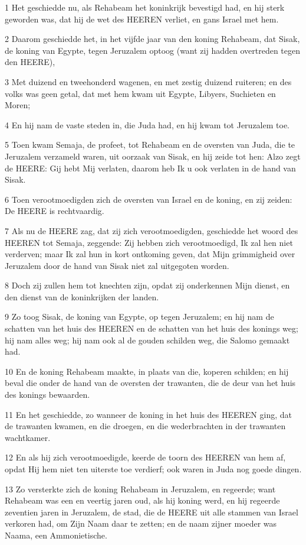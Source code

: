 \par 1 Het geschiedde nu, als Rehabeam het koninkrijk bevestigd had, en hij sterk geworden was, dat hij de wet des HEEREN verliet, en gans Israel met hem.
\par 2 Daarom geschiedde het, in het vijfde jaar van den koning Rehabeam, dat Sisak, de koning van Egypte, tegen Jeruzalem optoog (want zij hadden overtreden tegen den HEERE),
\par 3 Met duizend en tweehonderd wagenen, en met zestig duizend ruiteren; en des volks was geen getal, dat met hem kwam uit Egypte, Libyers, Suchieten en Moren;
\par 4 En hij nam de vaste steden in, die Juda had, en hij kwam tot Jeruzalem toe.
\par 5 Toen kwam Semaja, de profeet, tot Rehabeam en de oversten van Juda, die te Jeruzalem verzameld waren, uit oorzaak van Sisak, en hij zeide tot hen: Alzo zegt de HEERE: Gij hebt Mij verlaten, daarom heb Ik u ook verlaten in de hand van Sisak.
\par 6 Toen verootmoedigden zich de oversten van Israel en de koning, en zij zeiden: De HEERE is rechtvaardig.
\par 7 Als nu de HEERE zag, dat zij zich verootmoedigden, geschiedde het woord des HEEREN tot Semaja, zeggende: Zij hebben zich verootmoedigd, Ik zal hen niet verderven; maar Ik zal hun in kort ontkoming geven, dat Mijn grimmigheid over Jeruzalem door de hand van Sisak niet zal uitgegoten worden.
\par 8 Doch zij zullen hem tot knechten zijn, opdat zij onderkennen Mijn dienst, en den dienst van de koninkrijken der landen.
\par 9 Zo toog Sisak, de koning van Egypte, op tegen Jeruzalem; en hij nam de schatten van het huis des HEEREN en de schatten van het huis des konings weg; hij nam alles weg; hij nam ook al de gouden schilden weg, die Salomo gemaakt had.
\par 10 En de koning Rehabeam maakte, in plaats van die, koperen schilden; en hij beval die onder de hand van de oversten der trawanten, die de deur van het huis des konings bewaarden.
\par 11 En het geschiedde, zo wanneer de koning in het huis des HEEREN ging, dat de trawanten kwamen, en die droegen, en die wederbrachten in der trawanten wachtkamer.
\par 12 En als hij zich verootmoedigde, keerde de toorn des HEEREN van hem af, opdat Hij hem niet ten uiterste toe verdierf; ook waren in Juda nog goede dingen.
\par 13 Zo versterkte zich de koning Rehabeam in Jeruzalem, en regeerde; want Rehabeam was een en veertig jaren oud, als hij koning werd, en hij regeerde zeventien jaren in Jeruzalem, de stad, die de HEERE uit alle stammen van Israel verkoren had, om Zijn Naam daar te zetten; en de naam zijner moeder was Naama, een Ammonietische.
